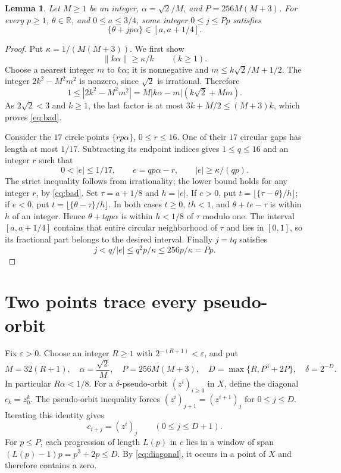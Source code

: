 \documentclass[11pt]{article}
\newtheorem{lemma}[theorem]{Lemma}
\begin{document}
\begin{lemma}\label{lem:rotation}
Let $M\geq1$ be an integer, $\alpha=\sqrt2/M$, and
$P=256M(M+3)$. For every $p\geq1$, $\theta\in\mathbb R$, and
$0\leq a\leq3/4$, some integer $0\leq j\leq Pp$ satisfies
\[
 \{\theta+jp\alpha\}\in[a,a+1/4].
\]
\end{lemma}
\begin{proof}
Put $\kappa=1/(M(M+3))$. We first show
\begin{equation}\label{eq:bad}
 \|k\alpha\|\geq\kappa/k\qquad(k\geq1).
\end{equation}
Choose a nearest integer $m$ to $k\alpha$; it is nonnegative and
$m\leq k\sqrt2/M+1/2$. The integer $2k^2-M^2m^2$ is nonzero,
since $\sqrt2$ is irrational. Therefore
\[
 1\leq |2k^2-M^2m^2|
   =M|k\alpha-m|(k\sqrt2+Mm).
\]
As $2\sqrt2<3$ and $k\geq1$, the last factor is at most
$3k+M/2\leq(M+3)k$, which proves \eqref{eq:bad}.

Consider the $17$ circle points $\{rp\alpha\}$, $0\leq r\leq16$.
One of their $17$ circular gaps has length at most $1/17$.
Subtracting its endpoint indices gives $1\leq q\leq16$ and an
integer $r$ such that
\[
 0<|e|\leq1/17,\qquad e=qp\alpha-r,
 \qquad |e|\geq\kappa/(qp).
\]
The strict inequality follows from irrationality; the lower bound
holds for any integer $r$, by \eqref{eq:bad}.
Set $\tau=a+1/8$ and $h=|e|$. If $e>0$, put
$t=\lfloor\{\tau-\theta\}/h\rfloor$; if $e<0$, put
$t=\lfloor\{\theta-\tau\}/h\rfloor$.
In both cases $t\geq0$, $th<1$, and
$\theta+te-\tau$ is within $h$ of an integer. Hence
$\theta+tqp\alpha$ is within $h<1/8$ of $\tau$ modulo one.
The interval $[a,a+1/4]$ contains that entire circular neighborhood
of $\tau$ and lies in $[0,1]$, so its fractional part belongs to
the desired interval. Finally $j=tq$ satisfies
\[
 j<q/|e|\leq q^2p/\kappa\leq256p/\kappa=Pp.
\]
\end{proof}

\section{Two points trace every pseudo-orbit}
Fix $\varepsilon>0$. Choose an integer $R\geq1$ with
$2^{-(R+1)}<\varepsilon$, and put
\begin{equation}\label{eq:parameters}
 M=32(R+1),\quad \alpha=\frac{\sqrt2}{M},\quad
 P=256M(M+3),\quad D=\max\{R,P^3+2P\},\quad\delta=2^{-D}.
\end{equation}
In particular $R\alpha<1/8$.
For a $\delta$-pseudo-orbit $(z^i)_{i\geq0}$ in $X$, define
the diagonal $c_k=z^k_0$. The pseudo-orbit inequality forces
$(z^i)_{j+1}=(z^{i+1})_j$ for $0\leq j\leq D$.
Iterating this identity gives
\begin{equation}\label{eq:diagonal}
 c_{i+j}=(z^i)_j\qquad(0\leq j\leq D+1).
\end{equation}
For $p\leq P$, each progression of length $L(p)$ in $c$ lies in
a window of span
$(L(p)-1)p=p^3+2p\leq D$. By \eqref{eq:diagonal}, it occurs
in a point of $X$ and therefore contains a zero.
\end{document}
